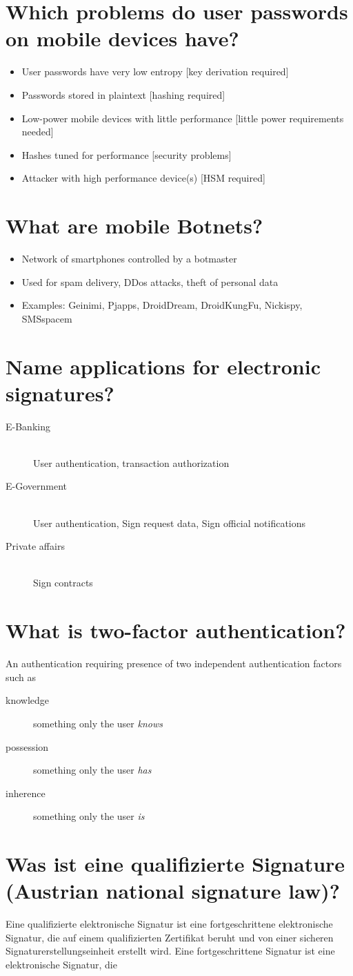 \documentclass[twocolumn]{article}
\newcommand{\question}[1]{\section{#1}}
\begin{document}
\question{Which problems do user passwords on mobile devices have?}
%
\begin{itemize}
  \item User passwords have very low entropy [key derivation required]
  \item Passwords stored in plaintext [hashing required]
  \item Low-power mobile devices with little performance [little power requirements needed]
  \item Hashes tuned for performance [security problems]
  \item Attacker with high performance device(s) [HSM required]
\end{itemize}

\question{What are mobile Botnets?}
%
\begin{itemize}
  \item Network of smartphones controlled by a botmaster
  \item Used for spam delivery, DDos attacks, theft of personal data
  \item Examples: Geinimi, Pjapps, DroidDream, DroidKungFu, Nickispy, SMSspacem
\end{itemize}

\question{Name applications for electronic signatures?}
%
\begin{description}
  \item[E-Banking]\hfill{}\\ User authentication, transaction authorization
  \item[E-Government]\hfill{}\\ User authentication, Sign request data, Sign official notifications
  \item[Private affairs]\hfill{}\\ Sign contracts
\end{description}

\question{What is two-factor authentication?}
%
An authentication requiring presence of two independent authentication factors such as
\begin{description}
  \item[knowledge] something only the user \emph{knows}
  \item[possession] something only the user \emph{has}
  \item[inherence] something only the user \emph{is}
\end{description}

\question{Was ist eine qualifizierte Signature (Austrian national signature law)?}
%
Eine qualifizierte elektronische Signatur ist eine fortgeschrittene elektronische Signatur, die auf einem qualifizierten Zertifikat beruht und von einer sicheren Signaturerstellungseinheit erstellt wird. Eine fortgeschrittene Signatur ist eine elektronische Signatur, die
\end{document}
